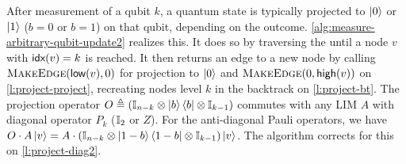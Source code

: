 After measurement of a qubit $k$, a quantum state is typically projected to $\ket 0$ or $\ket 1$
 ($b=0$ or $b=1$) on that qubit, depending on the outcome.
\autoref{alg:measure-arbitrary-qubit-update2} realizes this.
It does so by traversing the \limdd until a node $v$ with $\index(v) = k$ is reached.
It then returns an edge to a new node by calling $\makeedge(\low v, 0)$ for projection to $\ket 0$ and  $\makeedge(0, \high v)$ on \autoref{l:project-project},
recreating nodes level $k$ in the backtrack on \autoref{l:project-bt}.
The projection operator $O \defn (\id[n-k] \otimes \ket{b}\bra{b}\otimes \id[k-1])$ commutes with
any LIM $A$ with diagonal operator $P_k$ ($\id[2]$ or $Z$). For the anti-diagonal Pauli operators, we have $O \cdot A \ket v = A \cdot (\id[n-k] \otimes \ket{1-b}\bra{1-b}\otimes \id[k-1])  \ket v$.
The algorithm corrects for this on \autoref{l:project-diag2}.

